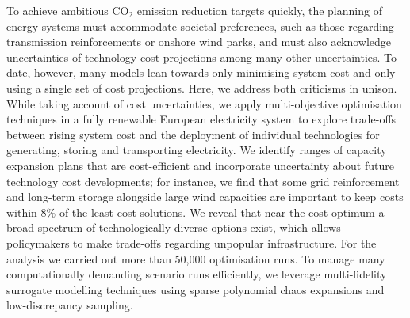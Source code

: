 To achieve ambitious CO$_2$ emission reduction targets quickly, the planning of
energy systems must accommodate societal preferences, such as those regarding
transmission reinforcements or onshore wind parks, and must also acknowledge
uncertainties of technology cost projections among many other uncertainties. To
date, however, many models lean towards only minimising system cost and only
using a single set of cost projections. Here, we address both criticisms in
unison. While taking account of cost uncertainties, we apply multi-objective
optimisation techniques in a fully renewable European electricity system to
explore trade-offs between rising system cost and the deployment of individual
technologies for generating, storing and transporting electricity. We identify
ranges of capacity expansion plans that are cost-efficient and incorporate
uncertainty about future technology cost developments; for instance, we find
that some grid reinforcement and long-term storage alongside large wind
capacities are important to keep costs within 8\% of the least-cost solutions.
We reveal that near the cost-optimum a broad spectrum of technologically diverse
options exist, which allows policymakers to make trade-offs regarding unpopular
infrastructure. For the analysis we carried out more than 50,000 optimisation runs. To
manage many computationally demanding scenario runs efficiently, we leverage
multi-fidelity surrogate modelling techniques using sparse polynomial chaos
expansions and low-discrepancy sampling.
